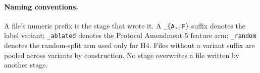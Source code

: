 \paragraph{Naming conventions.} A file's numeric prefix is the stage that wrote
it. A \texttt{\_\{A..F\}} suffix denotes the label variant; \texttt{\_ablated}
denotes the Protocol Amendment 5 feature arm; \texttt{\_random} denotes the
random-split arm used only for H4. Files without a variant suffix are pooled
across variants by construction. No stage overwrites a file written by another
stage.

